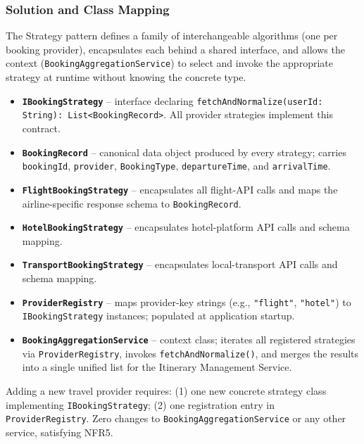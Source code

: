 \documentclass[12pt,a4paper]{article}
\begin{document}
\subsubsection{Solution and Class Mapping}

The Strategy pattern defines a family of interchangeable algorithms (one per booking provider),
encapsulates each behind a shared interface, and allows the context (\texttt{BookingAggregationService})
to select and invoke the appropriate strategy at runtime without knowing the concrete type.

\begin{itemize}[noitemsep]
  \item \textbf{\texttt{IBookingStrategy}} -- interface declaring
        \texttt{fetchAndNormalize(userId: String): List<BookingRecord>}. All provider
        strategies implement this contract.
  \item \textbf{\texttt{BookingRecord}} -- canonical data object produced by every strategy;
        carries \texttt{bookingId}, \texttt{provider}, \texttt{BookingType},
        \texttt{departureTime}, and \texttt{arrivalTime}.
  \item \textbf{\texttt{FlightBookingStrategy}} -- encapsulates all flight-API calls and maps
        the airline-specific response schema to \texttt{BookingRecord}.
  \item \textbf{\texttt{HotelBookingStrategy}} -- encapsulates hotel-platform API calls and
        schema mapping.
  \item \textbf{\texttt{TransportBookingStrategy}} -- encapsulates local-transport API calls
        and schema mapping.
  \item \textbf{\texttt{ProviderRegistry}} -- maps provider-key strings (e.g.,
        \texttt{"flight"}, \texttt{"hotel"}) to \texttt{IBookingStrategy} instances;
        populated at application startup.
  \item \textbf{\texttt{BookingAggregationService}} -- context class; iterates all registered
        strategies via \texttt{ProviderRegistry}, invokes \texttt{fetchAndNormalize()}, and
        merges the results into a single unified list for the Itinerary Management Service.
\end{itemize}

Adding a new travel provider requires: (1) one new concrete strategy class implementing
\texttt{IBookingStrategy}; (2) one registration entry in \texttt{ProviderRegistry}. Zero
changes to \texttt{BookingAggregationService} or any other service, satisfying NFR5.
\end{document}
